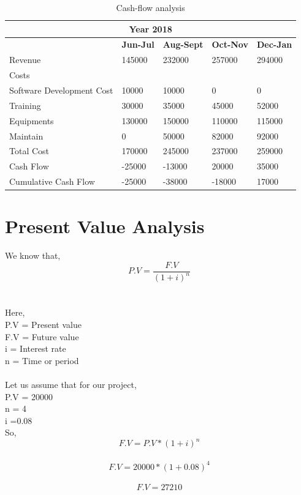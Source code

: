   \begin{table}[h]
  \begin{center}


\begin{tabular}{ |p{4cm}|p{2.5cm}|p{2.5cm}|p{2.5cm} |p{2.7cm}| }
 \hline
 \multicolumn{5}{|c|}{\textbf{Year 2018}} \\
 \hline
 & \textbf{ Jun-Jul } &   \textbf {Aug-Sept} & \textbf  {Oct-Nov} & \textbf { Dec-Jan }\\
 \hline
 Revenue & 145000 & 232000 & 257000 & 294000\\
 \hline
 Costs &  &  &  & \\
 \hline
 Software Development Cost & 10000  & 10000  & 0 &0 \\
 \hline
 
 Training & 30000  & 35000  & 45000  & 52000 \\
 \hline
 Equipments &  130000 & 150000  & 110000  &  115000\\
 \hline
 Maintain & 0 &  50000 & 82000 & 92000 \\
 \hline
 Total Cost & 170000 & 245000 & 237000  & 259000 \\
 \hline
 Cash Flow & -25000 & -13000  & 20000  & 35000 \\
 \hline
Cumulative Cash Flow & -25000 & -38000  & -18000  & 17000 \\
 \hline
\end{tabular}
\end{center}
\caption{Cash-flow analysis}



\end{table}

\section{Present Value Analysis}
We know that,
\[ P.V=\frac{F.V}{(1+i)^n} \] 

\section*{}
Here,\\
P.V = Present value\\
F.V = Future value\\
i = Interest rate\\
n = Time or period\\
\\
Let us assume that for our project,\\
P.V = 20000\\
n = 4\\
i =0.08\\
So,
\[ F.V={P.V}*{(1+i)^n} \]\\ 
\[ F.V={20000}*{(1+0.08)^4} \]\\ 
\[ F.V=27210 \]\\ 
\newpage

